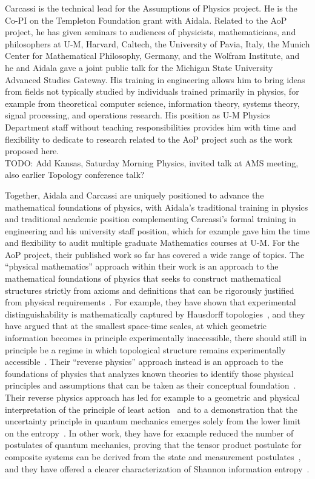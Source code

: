 Carcassi is the technical lead for the Assumptions of Physics project.  He is the Co-PI on the Templeton Foundation grant with Aidala.  Related to the AoP project, he has given seminars to audiences of physicists, mathematicians, and philosophers at U-M, Harvard, Caltech, the University of Pavia, Italy, the Munich Center for Mathematical Philosophy, Germany, and the Wolfram Institute, and he and Aidala gave a joint public talk for the Michigan State University Advanced Studies Gateway.  His training in engineering allows him to bring ideas from fields not typically studied by individuals trained primarily in physics, for example from theoretical computer science, information theory, systems theory, signal processing, and operations research.  His position as U-M Physics Department staff without teaching responsibilities provides him with time and flexibility to dedicate to research related to the AoP project such as the work proposed here. \\
TODO: Add Kansas, Saturday Morning Physics, invited talk at AMS meeting, also earlier Topology conference talk?

Together, Aidala and Carcassi are uniquely positioned to advance the mathematical foundations of physics, with Aidala's traditional training in physics and traditional academic position complementing Carcassi's formal training in engineering and his university staff position, which for example gave him the time and flexibility to audit multiple graduate Mathematics courses at U-M.  For the AoP project, their published work so far has covered a wide range of topics.  The ``physical mathematics'' approach within their work is an approach to the mathematical foundations of physics that seeks to construct mathematical structures strictly from axioms and definitions that can be rigorously justified from physical requirements~\cite{aop-book}.  For example, they have shown that experimental distinguishability is mathematically captured by Hausdorff topologies~\cite{aop-book,aop-topExpDisting}, and they have argued that at the smallest space-time scales, at which geometric information becomes in principle experimentally inaccessible, there should still in principle be a regime in which topological structure remains experimentally accessible~\cite{aop-spacetimeStruct}.  Their ``reverse physics'' approach instead is an approach to the foundations of physics that analyzes known theories to identify those physical principles and assumptions that can be taken as their conceptual foundation~\cite{aop-book,Carcassi:2022bpm}. Their reverse physics approach has led for example to a geometric and physical interpretation of the principle of least action~\cite{aop-action} and to a demonstration that the uncertainty principle in quantum mechanics emerges solely from the lower limit on the entropy~\cite{Carcassi:2022bpm}. In other work, they have for example reduced the number of postulates of quantum mechanics, proving that the tensor product postulate for composite systems can be derived from the state and measurement postulates~\cite{Carcassi2021four}, and they have offered a clearer characterization of Shannon information entropy~\cite{Carcassi:2021}. 

